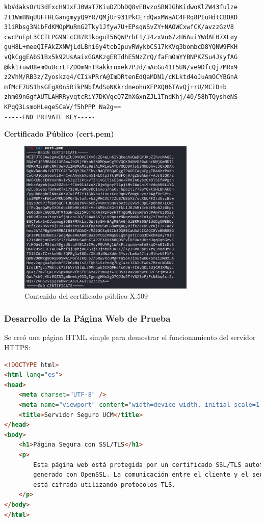 \documentclass[12pt,a4paper]{article}
\begin{document}
\begin{lstlisting}[caption=Private Key]
kbVdaksOrU3dFxcHN1xFJ0WaT7KiuDZDhDQ8vEBvzoSBNIGhKidwoKlZW43fulze
2t1WmBNqUUFFHLGangmyyQ9YR/QMjUr931PkCErdQwxMWaAC4FRq8PIuHdtCBOXD
31iRbsg3NibFdKMOpMuRnG2Tky1Jfyw7U+EPsqWSvZY+NAOWCxwfCK/avzzGzV8
cwcPnEpL3CCTLPG9NicCB7R1koguT56QWPrbF1/J4zxVn67zH6AuiYWdAE07XLøy
guH8L+meeQIFAkZXNWjLdLBni6y4tcbIpuvRWykbCS17kKVq3bombcD8YQNW9FKH
vQkCggEAbS1Bx5k92UsAaixGGAKzgERTdhE5NzZrQ/faFmOmYYBNPKZSu4JsyfAG
@kk1+uwU8em0uUcrLTZDOmNnTRakkruxek7PJd/mAcGu41T5UN/ve9DfcQj7MRx9
z2VhM/RB3z/Zyoskzq4/CIikPRrA@ImDRtenEdQaMDN1/cKLktd4oJuAmOCYBGnA
mfMcF7US1hsGFgX0n5RikPNbfAdSoNKkrdneohuXFPXQ06TAvQj+rU/MCiD+b
zhm09n6gfAUTLAHRRyvqtcRiY7DKVqcQ7ZhXGxnZJL1TndKhj/40/58hTQysheNS
KPqQ3LsmoHLeqeSCaV/f5hPPP Na2g==
-----END PRIVATE KEY-----
\end{lstlisting}

\textbf{Certificado Público (cert.pem)}

\begin{figure}[H]
  \centering
  \includegraphics[width=0.75\textwidth]{./assets/img2.png}
  \caption{Contenido del certificado público X.509}
  \label{fig:cert-content}
\end{figure}

\subsubsection{Desarrollo de la Página Web de Prueba}

Se creó una página HTML simple para demostrar el funcionamiento del servidor
HTTPS:

\begin{lstlisting}[language=html, caption=Página web de prueba para el servidor HTTPS]
<!DOCTYPE html>
<html lang="es">
<head>
    <meta charset="UTF-8" />
    <meta name="viewport" content="width=device-width, initial-scale=1.0" />
    <title>Servidor Seguro UCM</title>
</head>
<body>
    <h1>Página Segura con SSL/TLS</h1>
    <p>
        Esta página web está protegida por un certificado SSL/TLS autofirmado 
        generado con OpenSSL. La comunicación entre el cliente y el servidor 
        está cifrada utilizando protocolos TLS.
    </p>
</body>
</html>
\end{lstlisting}
\end{document}
